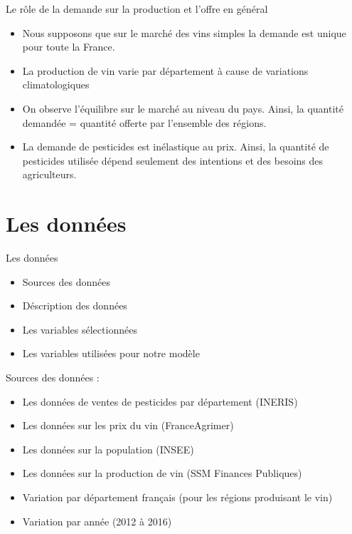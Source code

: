 \documentclass[11pt,ignorenonframetext,]{beamer}
\providecommand{\tightlist}{%
  \setlength{\itemsep}{0pt}\setlength{\parskip}{0pt}}
\begin{document}
\begin{frame}{Le rôle de la demande sur la production et l'offre en
général}
\protect\hypertarget{le-role-de-la-demande-sur-la-production-et-loffre-en-general}{}

\begin{itemize}
\tightlist
\item
  Nous supposons que sur le marché des vins simples la demande est
  unique pour toute la France.
\item
  La production de vin varie par département à cause de variations
  climatologiques
\item
  On observe l'équilibre sur le marché au niveau du pays. Ainsi, la
  quantité demandée = quantité offerte par l'ensemble des régions.
\item
  La demande de pesticides est inélastique au prix. Ainsi, la quantité
  de pesticides utilisée dépend seulement des intentions et des besoins
  des agriculteurs.
\end{itemize}

\end{frame}

\hypertarget{les-donnees}{%
\section{Les données}\label{les-donnees}}

\begin{frame}{Les données}
\protect\hypertarget{les-donnees-1}{}

\begin{itemize}
\tightlist
\item
  Sources des données
\item
  Déscription des données
\item
  Les variables sélectionnées
\item
  Les variables utilisées pour notre modèle
\end{itemize}

\end{frame}

\begin{frame}{Sources des données :}
\protect\hypertarget{sources-des-donnees}{}

\begin{itemize}
\tightlist
\item
  Les données de ventes de pesticides par département (INERIS)
\item
  Les données sur les prix du vin (FranceAgrimer)
\item
  Les données sur la population (INSEE)
\item
  Les données sur la production de vin (SSM Finances Publiques)
\item
  Variation par département français (pour les régions produisant le
  vin)
\item
  Variation par année (2012 à 2016)
\end{itemize}

\end{frame}
\end{document}
